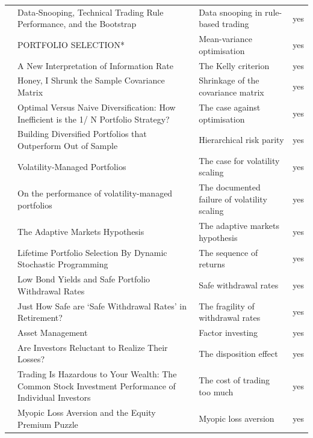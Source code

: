 \begin{tabular}{@{}P{1.32in}P{2.00in}P{0.92in}P{0.36in}@{}}
 & Data‐Snooping, Technical Trading Rule Performance, and the Bootstrap & Data snooping in rule-based trading & yes \\
 & PORTFOLIO SELECTION* & Mean-variance optimisation & yes \\
 & A New Interpretation of Information Rate & The Kelly criterion & yes \\
 & Honey, I Shrunk the Sample Covariance Matrix & Shrinkage of the covariance matrix & yes \\
 & Optimal Versus Naive Diversification: How Inefficient is the 1/ N Portfolio Strategy? & The case against optimisation & yes \\
 & Building Diversified Portfolios that Outperform Out of Sample & Hierarchical risk parity & yes \\
 & Volatility‐Managed Portfolios & The case for volatility scaling & yes \\
 & On the performance of volatility-managed portfolios & The documented failure of volatility scaling & yes \\
 & The Adaptive Markets Hypothesis & The adaptive markets hypothesis & yes \\
 & Lifetime Portfolio Selection By Dynamic Stochastic Programming & The sequence of returns & yes \\
 & Low Bond Yields and Safe Portfolio Withdrawal Rates & Safe withdrawal rates & yes \\
 & Just How Safe are ‘Safe Withdrawal Rates’ in Retirement? & The fragility of withdrawal rates & yes \\
 & Asset Management & Factor investing & yes \\
 & Are Investors Reluctant to Realize Their Losses? & The disposition effect & yes \\
 & Trading Is Hazardous to Your Wealth: The Common Stock Investment Performance of Individual Investors & The cost of trading too much & yes \\
 & Myopic Loss Aversion and the Equity Premium Puzzle & Myopic loss aversion & yes \\

\end{tabular}
